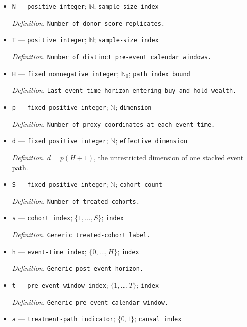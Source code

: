 \documentclass{article}
\begin{document}
\begin{itemize}
  \item \texttt{N} --- \texttt{positive integer}; \(\mathbb N\); \texttt{sample-\allowbreak{}size index}
  \par\smallskip\noindent\emph{Definition.} \texttt{Number of donor-\allowbreak{}score replicates.}
  \item \texttt{T} --- \texttt{positive integer}; \(\mathbb N\); \texttt{sample-\allowbreak{}size index}
  \par\smallskip\noindent\emph{Definition.} \texttt{Number of distinct pre-\allowbreak{}event calendar windows.}
  \item \texttt{H} --- \texttt{fixed nonnegative integer}; \(\mathbb N_0\); \texttt{path index bound}
  \par\smallskip\noindent\emph{Definition.} \texttt{Last event-\allowbreak{}time horizon entering buy-\allowbreak{}and-\allowbreak{}hold wealth.}
  \item \texttt{p} --- \texttt{fixed positive integer}; \(\mathbb N\); \texttt{dimension}
  \par\smallskip\noindent\emph{Definition.} \texttt{Number of proxy coordinates at each event time.}
  \item \texttt{d} --- \texttt{fixed positive integer}; \(\mathbb N\); \texttt{effective dimension}
  \par\smallskip\noindent\emph{Definition.} \(d=p(H+1)\), the unrestricted dimension of one stacked event path.
  \item \texttt{S} --- \texttt{fixed positive integer}; \(\mathbb N\); \texttt{cohort count}
  \par\smallskip\noindent\emph{Definition.} \texttt{Number of treated cohorts.}
  \item \texttt{s} --- \texttt{cohort index}; \(\{1,\ldots,S\}\); \texttt{index}
  \par\smallskip\noindent\emph{Definition.} \texttt{Generic treated-\allowbreak{}cohort label.}
  \item \texttt{h} --- \texttt{event-\allowbreak{}time index}; \(\{0,\ldots,H\}\); \texttt{index}
  \par\smallskip\noindent\emph{Definition.} \texttt{Generic post-\allowbreak{}event horizon.}
  \item \texttt{t} --- \texttt{pre-\allowbreak{}event window index}; \(\{1,\ldots,T\}\); \texttt{index}
  \par\smallskip\noindent\emph{Definition.} \texttt{Generic pre-\allowbreak{}event calendar window.}
  \item \texttt{a} --- \texttt{treatment-\allowbreak{}path indicator}; \(\{0,1\}\); \texttt{causal index}

\end{itemize}
\end{document}
